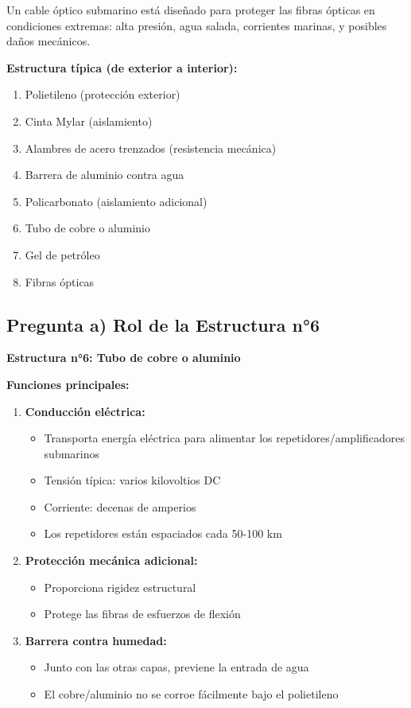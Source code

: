 \documentclass[11pt,a4paper]{article}
\begin{document}
Un cable óptico submarino está diseñado para proteger las fibras ópticas en condiciones extremas: alta presión, agua salada, corrientes marinas, y posibles daños mecánicos.

\textbf{Estructura típica (de exterior a interior):}
\begin{enumerate}
    \item Polietileno (protección exterior)
    \item Cinta Mylar (aislamiento)
    \item Alambres de acero trenzados (resistencia mecánica)
    \item Barrera de aluminio contra agua
    \item Policarbonato (aislamiento adicional)
    \item Tubo de cobre o aluminio
    \item Gel de petróleo
    \item Fibras ópticas
\end{enumerate}

\subsection{Pregunta a) Rol de la Estructura n°6}

\textbf{Estructura n°6: Tubo de cobre o aluminio}

\textbf{Funciones principales:}

\begin{enumerate}
    \item \textbf{Conducción eléctrica:}
    \begin{itemize}
        \item Transporta energía eléctrica para alimentar los repetidores/amplificadores submarinos
        \item Tensión típica: varios kilovoltios DC
        \item Corriente: decenas de amperios
        \item Los repetidores están espaciados cada 50-100 km
    \end{itemize}
    
    \item \textbf{Protección mecánica adicional:}
    \begin{itemize}
        \item Proporciona rigidez estructural
        \item Protege las fibras de esfuerzos de flexión
    \end{itemize}
    
    \item \textbf{Barrera contra humedad:}
    \begin{itemize}
        \item Junto con las otras capas, previene la entrada de agua
        \item El cobre/aluminio no se corroe fácilmente bajo el polietileno
    \end{itemize}
\end{enumerate}
\end{document}
